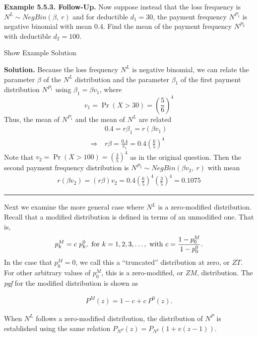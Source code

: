 \documentclass[]{book}
\theoremstyle{definition}
\theoremstyle{definition}
\theoremstyle{definition}
\theoremstyle{remark}
\begin{document}
\textbf{Example 5.5.3. Follow-Up.} Now suppose instead that the loss
frequency is \(N^L \sim NegBin(\beta,\ r)\) and for deductible
\(d_1=30\), the payment frequency \(N^{P_1}\) is negative binomial with
mean \(0.4\). Find the mean of the payment frequency \(N^{P_2}\) with
deductible \(d_2=100\).

Show Example Solution

\hypertarget{toggleExampleAggLoss.5.3}{}
\textbf{Solution.} Because the loss frequency \(N^L\) is negative
binomial, we can relate the parameter \(\beta\) of the \(N^L\)
distribution and the parameter \(\beta_1\) of the first payment
distribution \(N^{P_1}\) using \(\beta_1 = \beta v_1\), where
\[v_1 = \Pr(X > 30) = \left( \frac{5}{6} \right)^4\] Thus, the mean of
\(N^{P_1}\) and the mean of \(N^L\) are related \[\begin{aligned}
&0.4 =  r \beta_1 = r \left(\beta v_1\right) \\
\Rightarrow \ & r\beta = \frac{0.4}{v_1} = 0.4 \left(\frac{6}{5} \right)^4
\end{aligned}\] Note that
\(v_2 = \Pr(X > 100) = \left( \frac{3}{5}\right)^4\) as in the original
question. Then the second payment frequency distribution is
\(N^{P_2} \sim NegBin(\beta v_2, \ r)\) with mean \[\begin{aligned}
r (\beta v_2) = (r \beta) v_2 = 0.4 \left( \frac{6}{5}\right)^4 \left( \frac{3}{5} \right)^4 = 0.1075
\end{aligned}\]

\begin{center}\rule{0.5\linewidth}{\linethickness}\end{center}

Next we examine the more general case where \(N^L\) is a zero-modified
distribution. Recall that a modified distribution is defined in terms of
an unmodified one. That is, \[\begin{aligned}
p_k^M = c~p_k^0, {~\rm for~} k=1,2,3,\ldots,  {~\rm with~}c = \frac{1-p_0^M}{1-p_0^0}.
\end{aligned}\] In the case that \(p_0^M=0\), we call this a
``truncated'' distribution at zero, or \(ZT\). For other arbitrary
values of \(p_0^M\), this is a zero-modified, or \(ZM\), distribution.
The \emph{pgf} for the modified distribution is shown as

\begin{eqnarray*}
P^M(z) = 1-c+c~P^0(z).
\end{eqnarray*}

When \(N^L\) follows a zero-modified distribution, the distribution of
\(N^P\) is established using the same relation
\(P_{N^P}(z)=P_{N^L}\left(1+v(z-1)\right)\).
\end{document}
